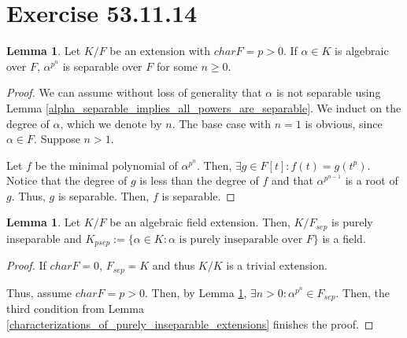 \documentclass{article}
\theoremstyle{definition}
\newtheorem{lemma}[theorem]{Lemma}
\begin{document}
\newpage

\section{Exercise 53.11.14}

\begin{lemma}\label{powers_of_elements_are_separable_in_fields_of_char_p}
    Let $K/F$ be an extension with $charF = p > 0$.
    If $\alpha \in K$ is algebraic over $F$, $\alpha^{p^{n}}$ is separable over $F$ for some $n \geq 0$.
\end{lemma}
\begin{proof}
    We can assume without loss of generality that $\alpha$ is not separable
    using Lemma \ref{alpha_separable_implies_all_powers_are_separable}.
    We induct on the degree of $\alpha$, which we denote by $n$. The base case
    with $n = 1$ is obvious, since $\alpha \in F$. Suppose $n > 1$.

    Let $f$ be the minimal polynomial of $\alpha^{p^{n}}$.
    Then, $\exists g \in F[t]: f(t) = g(t^{p})$. Notice that
    the degree of $g$ is less than the degree of $f$ and that $\alpha^{p^{n-1}}$
    is a root of $g$. Thus, $g$ is separable. Then, $f$ is separable.
\end{proof}

\begin{lemma}
    Let $K/F$ be an algebraic field extension. Then, $K/F_{sep}$ is purely inseparable
    and $K_{psep} := \{ \alpha \in K: \alpha \text{ is purely inseparable over $F$}\}$
    is a field.
\end{lemma}
\begin{proof}
    If $charF = 0$, $F_{sep} = K$ and thus $K/K$ is a trivial extension.

    Thus, assume $charF = p > 0$. Then, by Lemma \ref{powers_of_elements_are_separable_in_fields_of_char_p},
    $\exists n > 0: \alpha^{p^{n}} \in F_{sep}$. Then, the third condition from Lemma \ref{characterizations_of_purely_inseparable_extensions}
    finishes the proof.
\end{proof}
\end{document}
